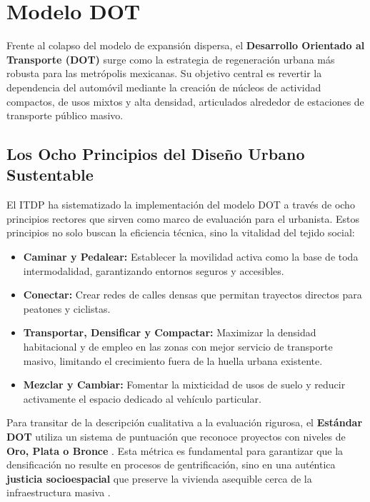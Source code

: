 
\section{Modelo DOT}

Frente al colapso del modelo de expansión dispersa, el 
\textbf{Desarrollo Orientado al Transporte (DOT)} surge como la estrategia de regeneración 
urbana más robusta para las metrópolis mexicanas. 
Su objetivo central es revertir la dependencia del automóvil mediante la creación de núcleos 
de actividad compactos, de usos mixtos y alta densidad, articulados alrededor de estaciones 
de transporte público masivo.

\subsection{Los Ocho Principios del Diseño Urbano Sustentable}
\label{subsubsec:ocho-principios}

El ITDP ha sistematizado la implementación del modelo DOT a través de ocho principios 
rectores que sirven como marco de evaluación para el urbanista. Estos principios no solo 
buscan la eficiencia técnica, sino la vitalidad del tejido social:

\begin{itemize}
    \item \textbf{Caminar y Pedalear:} Establecer la movilidad activa como la base de 
            toda intermodalidad, garantizando entornos seguros y accesibles.
    \item \textbf{Conectar:} Crear redes de calles densas que permitan trayectos directos 
            para peatones y ciclistas.
    \item \textbf{Transportar, Densificar y Compactar:} Maximizar la densidad habitacional 
            y de empleo en las zonas con mejor servicio de transporte masivo, 
            limitando el crecimiento fuera de la huella urbana existente.
    \item \textbf{Mezclar y Cambiar:} Fomentar la mixticidad de usos de suelo y reducir 
            activamente el espacio dedicado al vehículo particular.
\end{itemize}

Para transitar de la descripción cualitativa a la evaluación rigurosa, el \textbf{Estándar DOT} 
utiliza un sistema de puntuación que reconoce proyectos con niveles de 
\textbf{Oro, Plata o Bronce} \cite{batista2015, ugur2025}. 
Esta métrica es fundamental para garantizar que la densificación no resulte en procesos de 
gentrificación, sino en una auténtica \textbf{justicia socioespacial} que preserve 
la vivienda asequible cerca de la infraestructura masiva \cite{moreno2023}.

